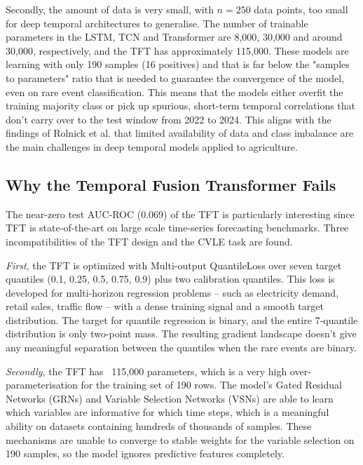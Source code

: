 \documentclass{ieeeaccess}
\begin{document}
Secondly, the amount of data is very small, with $n = 250$ data points, too small for deep temporal architectures to generalise. The number of trainable parameters in the LSTM, TCN and Transformer are 8,000, 30,000 and around 30,000, respectively, and the TFT has approximately 115,000. These models are learning with only 190 samples (16 positives) and that is far below the "samples to parameters" ratio that is needed to guarantee the convergence of the model, even on rare event classification. This means that the models either overfit the training majority class or pick up spurious, short-term temporal correlations that don't carry over to the test window from 2022 to 2024. This aligns with the findings of Rolnick et al. \cite{rolnick2022} that limited availability of data and class imbalance are the main challenges in deep temporal models applied to agriculture.

\subsection{Why the Temporal Fusion Transformer Fails}

The near-zero test AUC-ROC (0.069) of the TFT is particularly interesting since TFT is state-of-the-art on large scale time-series forecasting benchmarks. Three incompatibilities of the TFT design and the CVLE task are found.

\textit{First}, the TFT is optimized with Multi-output QuantileLoss over seven target quantiles (0.1, 0.25, 0.5, 0.75, 0.9) plus two calibration quantiles. This loss is developed for multi-horizon regression problems – such as electricity demand, retail sales, traffic flow – with a dense training signal and a smooth target distribution. The target for quantile regression is binary, and the entire 7-quantile distribution is only two-point mass. The resulting gradient landscape doesn't give any meaningful separation between the quantiles when the rare events are binary.

\textit{Secondly}, the TFT has ~115,000 parameters, which is a very high over-parameterisation for the training set of 190 rows. The model's Gated Residual Networks (GRNs) and Variable Selection Networks (VSNs) are able to learn which variables are informative for which time steps, which is a meaningful ability on datasets containing hundreds of thousands of samples. These mechanisms are unable to converge to stable weights for the variable selection on 190 samples, so the model ignores predictive features completely.
\end{document}
